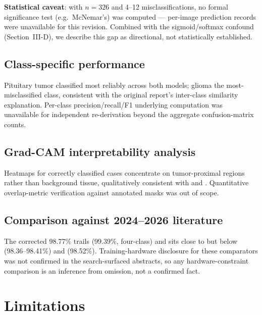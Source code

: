 \documentclass[journal]{IEEEtran}
\begin{document}
\textbf{Statistical caveat}: with $n=326$ and 4--12 misclassifications, no formal significance test (e.g.\ McNemar's) was computed --- per-image prediction records were unavailable for this revision. Combined with the sigmoid/softmax confound (Section~III-D), we describe this gap as directional, not statistically established.

\subsection{Class-specific performance}
Pituitary tumor classified most reliably across both models; glioma the most-misclassified class, consistent with the original report's inter-class similarity explanation. Per-class precision/recall/F1 underlying computation was unavailable for independent re-derivation beyond the aggregate confusion-matrix counts.

\subsection{Grad-CAM interpretability analysis}
Heatmaps for correctly classified cases concentrate on tumor-proximal regions rather than background tissue, qualitatively consistent with \cite{ref4} and \cite{ref12}. Quantitative overlap-metric verification against annotated masks was out of scope.

\subsection{Comparison against 2024--2026 literature}
The corrected 98.77\% trails \cite{ref11} (99.39\%, four-class) and sits close to but below \cite{ref15} (98.36--98.41\%) and \cite{ref12} (98.52\%). Training-hardware disclosure for these comparators was not confirmed in the search-surfaced abstracts, so any hardware-constraint comparison is an inference from omission, not a confirmed fact.

\section{Limitations}
\end{document}
